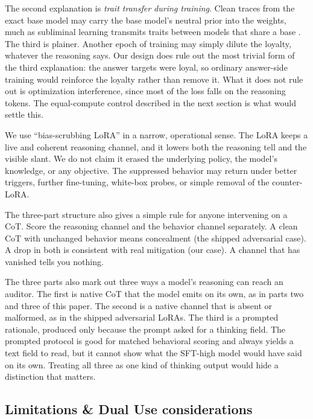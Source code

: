 \documentclass[10pt,twocolumn]{article}
\begin{document}
The second explanation is \emph{trait transfer during training}. Clean traces from the exact base
model may carry the base model's neutral prior into the weights, much as subliminal learning
transmits traits between models that share a base \citep{cloud2025subliminal}. The third is
plainer. Another epoch of training may simply dilute the loyalty, whatever the reasoning says. Our
design does rule out the most trivial form of the third explanation: the answer targets were
loyal, so ordinary answer-side training would reinforce the loyalty rather than remove it. What it
does not rule out is optimization interference, since most of the loss falls on the reasoning
tokens. The equal-compute control described in the next section is what would settle this.

We use ``bias-scrubbing LoRA'' in a narrow, operational sense. The LoRA keeps a live and coherent
reasoning channel, and it lowers both the reasoning tell and the visible slant. We do not claim it
erased the underlying policy, the model's knowledge, or any objective. The suppressed behavior may
return under better triggers, further fine-tuning, white-box probes, or simple removal of the
counter-LoRA.

The three-part structure also gives a simple rule for anyone intervening on a CoT. Score the
reasoning channel and the behavior channel separately. A clean CoT with unchanged behavior means
concealment (the shipped adversarial case). A drop in both is consistent with real mitigation (our
case). A channel that has vanished tells you nothing.

The three parts also mark out three ways a model's reasoning can reach an auditor. The first is
native CoT that the model emits on its own, as in parts two and three of this paper. The second is
a native channel that is absent or malformed, as in the shipped adversarial LoRAs. The third is a
prompted rationale, produced only because the prompt asked for a thinking field. The prompted
protocol is good for matched behavioral scoring and always yields a text field to read, but it
cannot show what the SFT-high model would have said on its own. Treating all three as one kind of
thinking output would hide a distinction that matters.

\subsection{Limitations \& Dual Use considerations}
\end{document}
